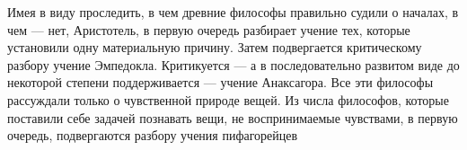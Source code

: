 \documentclass{article}
\begin{document}
Имея в виду проследить, в чем древние философы правильно судили о началах, в чем --- нет, Аристотель, в первую очередь разбирает учение тех, которые установили одну материальную причину. Затем подвергается критическому разбору учение Эмпедокла. Критикуется --- а в последовательно развитом виде до некоторой степени поддерживается --- учение Анаксагора. Все эти философы рассуждали только о чувственной природе вещей. Из числа философов, которые поставили себе задачей познавать вещи, не воспринимаемые чувствами, в первую очередь, подвергаются разбору учения пифагорейцев
\end{document}
